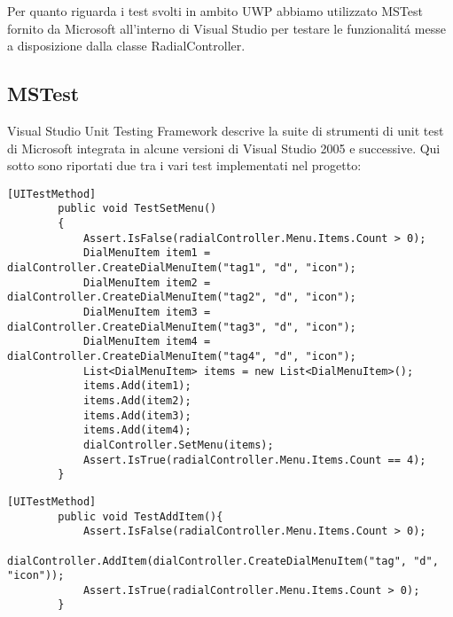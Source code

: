 Per quanto riguarda i test svolti in ambito UWP abbiamo utilizzato MSTest fornito da Microsoft all’interno di Visual Studio per testare le funzionalitá messe a disposizione dalla classe RadialController.

\subsection{MSTest}
Visual Studio Unit Testing Framework descrive la suite di strumenti di unit test di Microsoft integrata in alcune versioni di Visual Studio 2005 e successive.
Qui sotto sono riportati due tra i vari test implementati nel progetto:
 
\vspace{1.0cm}
\begin{lstlisting}[caption={Test SetMenu},style=javaScriptCode]
    [UITestMethod]
        public void TestSetMenu()
        {
            Assert.IsFalse(radialController.Menu.Items.Count > 0);
            DialMenuItem item1 = dialController.CreateDialMenuItem("tag1", "d", "icon");
            DialMenuItem item2 = dialController.CreateDialMenuItem("tag2", "d", "icon");
            DialMenuItem item3 = dialController.CreateDialMenuItem("tag3", "d", "icon");
            DialMenuItem item4 = dialController.CreateDialMenuItem("tag4", "d", "icon");
            List<DialMenuItem> items = new List<DialMenuItem>();
            items.Add(item1);
            items.Add(item2);
            items.Add(item3);
            items.Add(item4);
            dialController.SetMenu(items);
            Assert.IsTrue(radialController.Menu.Items.Count == 4);
        }
\end{lstlisting} 
\vspace{1.0cm}

\vspace{1.0cm}
\begin{lstlisting}[caption={Test aggiunta voce di Menu'},style=javaScriptCode]
  [UITestMethod]
        public void TestAddItem(){
            Assert.IsFalse(radialController.Menu.Items.Count > 0);
            dialController.AddItem(dialController.CreateDialMenuItem("tag", "d", "icon"));
            Assert.IsTrue(radialController.Menu.Items.Count > 0);
        }
\end{lstlisting} 
\vspace{1.0cm}
